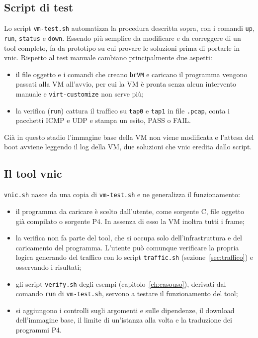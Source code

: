 \subsection{Script di test}

Lo script \texttt{vm-test.sh} automatizza la procedura descritta sopra, con i comandi \texttt{up}, \texttt{run}, \texttt{status} e \texttt{down}. Essendo più semplice da modificare e da correggere di un tool completo, fa da prototipo su cui provare le soluzioni prima di portarle in vnic. Rispetto al test manuale cambiano principalmente due aspetti:
\begin{itemize}
    \item il file oggetto e i comandi che creano \texttt{brVM} e caricano il programma vengono passati alla VM all'avvio, per cui la VM è pronta senza alcun intervento manuale e \texttt{virt-customize} non serve più;
    \item la verifica (\texttt{run}) cattura il traffico su \texttt{tap0} e \texttt{tap1} in file \texttt{.pcap}, conta i pacchetti ICMP e UDP e stampa un esito, PASS o FAIL.
\end{itemize}
Già in questo stadio l'immagine base della VM non viene modificata e l'attesa del boot avviene leggendo il log della VM, due soluzioni che vnic eredita dallo script.

\subsection{Il tool vnic}

\texttt{vnic.sh} nasce da una copia di \texttt{vm-test.sh} e ne generalizza il funzionamento:
\begin{itemize}
    \item il programma da caricare è scelto dall'utente, come sorgente C, file oggetto già compilato o sorgente P4. In assenza di esso la VM inoltra tutti i frame;
    \item la verifica non fa parte del tool, che si occupa solo dell'infrastruttura e del caricamento del programma. L'utente può comunque verificare la propria logica generando del traffico con lo script \texttt{traffic.sh} (sezione~\ref{sec:traffico}) e osservando i risultati;
    \item gli script \texttt{verify.sh} degli esempi (capitolo~\ref{ch:casouso}), derivati dal comando \texttt{run} di \texttt{vm-test.sh}, servono a testare il funzionamento del tool;
    \item si aggiungono i controlli sugli argomenti e sulle dipendenze, il download dell'immagine base, il limite di un'istanza alla volta e la traduzione dei programmi P4.
\end{itemize}

